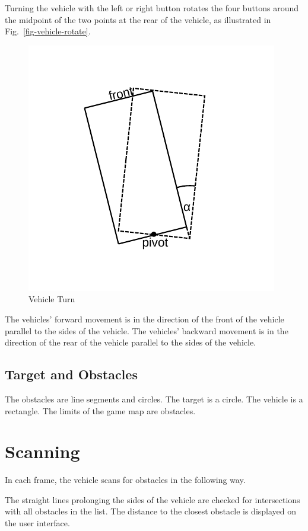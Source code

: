 \documentclass[11pt]{article}
\newcommand{\figref}[1]{Fig.~\eqref{#1}}
\begin{document}
Turning the vehicle with the left or right button rotates the four buttons
around the midpoint of the two points at the rear of the vehicle, as
illustrated in \figref{fig-vehicle-rotate}.
\begin{figure}
    \centering
    \includegraphics[trim=0 30 0 30]{vehicle-turn.pdf}
    \caption{Vehicle Turn}\label{fig-vehicle-rotate}
\end{figure}
The vehicles' forward movement is in the direction of the front of the vehicle
parallel to the sides of the vehicle.
The vehicles' backward movement is in the direction of the rear of the vehicle
parallel to the sides of the vehicle.

\subsection{Target and Obstacles}
\label{sec-obstacles}

The obstacles are line segments and circles. The target is a circle. The
vehicle is a rectangle. The limits of the game map are obstacles.

\pagebreak
\section{Scanning}
\label{sec-scanning}
In each frame, the vehicle scans for obstacles in the following way.

The straight lines prolonging the sides of the vehicle are checked for
intersections with all obstacles in the list. The distance to the closest
obstacle is displayed on the user interface.
\end{document}
